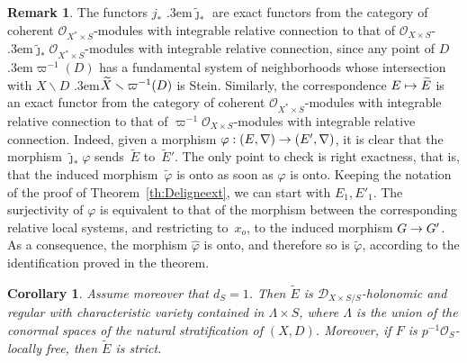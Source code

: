 \documentclass[english]{smfart}
\numberwithin{subsection}{section}
\def\shd{\mathcal{D}}\let\cD\shd
\def\sho{\mathcal{O}}\let\cO\sho
\newcommand{\XS}{X\times S}
\newcommand{\XsS}{X^*\times S}
\newcommand{\DXS}{\shd_{\XS/S}}
\let\wt\widetilde
\let\wh\widehat
\def\resp{\text{resp.}\kern.3em}
\let\moins\smallsetminus
\def\wtj{\wt\jmath}
\newcommand{\pOS}{p^{-1}\sho_S}
\numberwithin{equation}{section}
\theoremstyle{plain}
\newtheorem{corollary}[equation]{Corollary}
\theoremstyle{definition}
\newtheorem{remark}[equation]{Remark}
\def\to{\mathchoice{\longrightarrow}{\rightarrow}{\rightarrow}{\rightarrow}}
\def\mto{\mathchoice{\longmapsto}{\mapsto}{\mapsto}{\mapsto}}
\begin{document}
\begin{remark}\label{rem:tildeexactfunctor}
The functors $j_*$ \resp $\wtj_*$ are exact functors from the category of coherent $\cO_{\XsS}$-modules with integrable relative connection to that of $\cO_{\XS}$- \resp $\wtj_*\cO_{\XsS}$-modules with integrable relative connection, since any point of $D$ \resp $\varpi^{-1}(D)$ has a fundamental system of neighborhoods whose intersection with $X\moins D$ \resp $\wt X\moins\nobreak\varpi^{-1}(D)$ is Stein. Similarly, the correspondence $E\mto\wt E$ is an exact functor from the category of coherent $\cO_{\XsS}$-modules with integrable relative connection to that of $\varpi^{-1}\cO_{\XS}$-modules with integrable relative connection. Indeed, given a morphism $\varphi:(E,\nabla)\to(E',\nabla)$, it is clear that the morphism $\wtj_*\varphi$ sends~$\wt E$ to~$\wt E'$. The only point to check is right exactness, that is, that the induced morphism~$\wt\varphi$ is onto as soon as $\varphi$ is onto. Keeping the notation of the proof of Theorem~\ref{th:Deligneext}, we can start with $E_1,E'_1$. The surjectivity of $\varphi$ is equivalent to that of the morphism between the corresponding relative local systems, and restricting to~$x_o$, to the induced morphism $G\to G'$. As a consequence, the morphism $\wh\varphi$ is onto, and therefore so is $\wt\varphi$, according to the identification proved in the theorem.
\end{remark}

\begin{corollary}\label{cor:Deligneext}
Assume moreover that $d_S=1$. Then $\wt E$ is $\DXS$-holonomic and regular with characteristic variety contained in $\Lambda\times S$, where $\Lambda$ is the union of the conormal spaces of the natural stratification of $(X,D)$. Moreover, if $F$ is $\pOS$-locally free, then $\wt E$ is strict.
\end{corollary}
\end{document}
